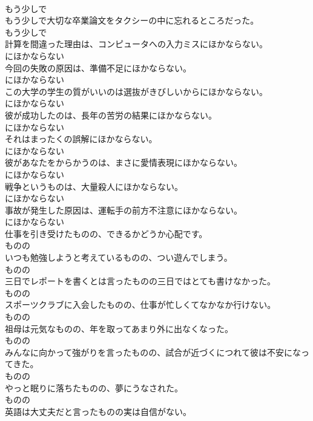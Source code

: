 \documentclass[8pt]{extreport}
\begin{document}
\begin{CJK}{UTF8}{min}
\\	もう少しで
\\	もう少しで大切な卒業論文をタクシーの中に忘れるところだった。	
\\	もう少しで
\\	計算を間違った理由は、コンピュータへの入力ミスにほかならない。	
\\	にほかならない
\\	今回の失敗の原因は、準備不足にほかならない。	
\\	にほかならない
\\	この大学の学生の質がいいのは選抜がきびしいからにほかならない。	
\\	にほかならない
\\	彼が成功したのは、長年の苦労の結果にほかならない。	
\\	にほかならない
\\	それはまったくの誤解にほかならない。	
\\	にほかならない
\\	彼があなたをからかうのは、まさに愛情表現にほかならない。	
\\	にほかならない
\\	戦争というものは、大量殺人にほかならない。	
\\	にほかならない
\\	事故が発生した原因は、運転手の前方不注意にほかならない。	
\\	にほかならない
\\	仕事を引き受けたものの、できるかどうか心配です。	
\\	ものの
\\	いつも勉強しようと考えているものの、つい遊んでしまう。	
\\	ものの
\\	三日でレポートを書くとは言ったものの三日ではとても書けなかった。	
\\	ものの
\\	スポーツクラブに入会したものの、仕事が忙しくてなかなか行けない。	
\\	ものの
\\	祖母は元気なものの、年を取ってあまり外に出なくなった。	
\\	ものの
\\	みんなに向かって強がりを言ったものの、試合が近づくにつれて彼は不安になってきた。	
\\	ものの
\\	やっと眠りに落ちたものの、夢にうなされた。	
\\	ものの
\\	英語は大丈夫だと言ったものの実は自信がない。	

\end{CJK}
\end{document}
